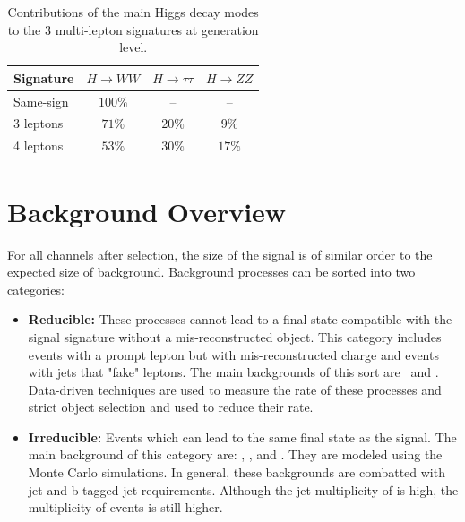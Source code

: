 \begin{table}[htbp]
  \begin{center} 
    \caption{Contributions of the main Higgs decay modes to the 3 multi-lepton
      \tth signatures at generation level.
      }\label{ana:table_decay} 
      \begin{tabular}{l|c|c|c} 
      \hline\hline
  Signature & $H \rightarrow WW$  & $H\rightarrow \tau\tau$  & $H \rightarrow
  ZZ$  \\\hline
  Same-sign &  $100\%$ & -- & -- \\
  3 leptons  &  $71\%$ & $20\%$ & $9\%$ \\
  4 leptons  &  $53\%$ & $30\%$ & $17\%$  \\
     \hline
    \end{tabular}
  \end{center}
\end{table}



\section{Background Overview}

For all channels after selection, the size of the signal is of similar order to the expected size of background.
Background processes can be sorted into two categories:

\begin{itemize}

\item \textbf{Reducible:} These processes cannot lead to a final state compatible with the
  signal signature without a mis-reconstructed object. This category includes
  events with a prompt lepton but with mis-reconstructed charge and events
  with jets that "fake" leptons.  The main backgrounds of this sort are \ttbar\ and \zj. Data-driven techniques are used to measure the rate of these processes and strict object
  selection and used to reduce their rate. 

\item \textbf{Irreducible:} Events which can lead to the same final state as the signal.
 The main background of this category are: \ttV, \WZ, and \ZZ.
 They are modeled using the Monte Carlo simulations. In general,
 these backgrounds are combatted with jet and b-tagged jet requirements. 
 Although the jet multiplicity of \ttV is high, the multiplicity of \tth 
 events is still higher. 

\end{itemize}



